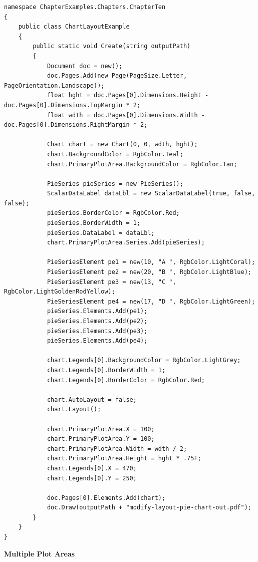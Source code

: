 \documentclass[american]{tufte-book}
\numberwithin{equation}{section}
\numberwithin{figure}{section}
\begin{document}
{\begin{lstlisting}[caption={Modifying a chart's layout manually.},label={lis:Modifying-a-chart's},basicstyle={\footnotesize\ttfamily},breaklines=true]
namespace ChapterExamples.Chapters.ChapterTen
{
    public class ChartLayoutExample
    {
        public static void Create(string outputPath)
        {
            Document doc = new();
            doc.Pages.Add(new Page(PageSize.Letter, PageOrientation.Landscape));
            float hght = doc.Pages[0].Dimensions.Height - doc.Pages[0].Dimensions.TopMargin * 2;
            float wdth = doc.Pages[0].Dimensions.Width - doc.Pages[0].Dimensions.RightMargin * 2;

            Chart chart = new Chart(0, 0, wdth, hght);
            chart.BackgroundColor = RgbColor.Teal;
            chart.PrimaryPlotArea.BackgroundColor = RgbColor.Tan;

            PieSeries pieSeries = new PieSeries();
            ScalarDataLabel dataLbl = new ScalarDataLabel(true, false, false);
            pieSeries.BorderColor = RgbColor.Red;
            pieSeries.BorderWidth = 1;
            pieSeries.DataLabel = dataLbl;
            chart.PrimaryPlotArea.Series.Add(pieSeries);

            PieSeriesElement pe1 = new(10, "A ", RgbColor.LightCoral);
            PieSeriesElement pe2 = new(20, "B ", RgbColor.LightBlue);
            PieSeriesElement pe3 = new(13, "C ", RgbColor.LightGoldenRodYellow);
            PieSeriesElement pe4 = new(17, "D ", RgbColor.LightGreen);
            pieSeries.Elements.Add(pe1);
            pieSeries.Elements.Add(pe2);
            pieSeries.Elements.Add(pe3);
            pieSeries.Elements.Add(pe4);

            chart.Legends[0].BackgroundColor = RgbColor.LightGrey;
            chart.Legends[0].BorderWidth = 1;
            chart.Legends[0].BorderColor = RgbColor.Red;
            
            chart.AutoLayout = false;
            chart.Layout();
            
            chart.PrimaryPlotArea.X = 100;
            chart.PrimaryPlotArea.Y = 100;
            chart.PrimaryPlotArea.Width = wdth / 2;
            chart.PrimaryPlotArea.Height = hght * .75F;
            chart.Legends[0].X = 470;
            chart.Legends[0].Y = 250;

            doc.Pages[0].Elements.Add(chart);
            doc.Draw(outputPath + "modify-layout-pie-chart-out.pdf");
        }
    }
}
\end{lstlisting}
\leavevmode\egroup

\noindent\begin{flushleft}
\textbf{Multiple Plot Areas}
\par\end{flushleft}

}
\end{document}
